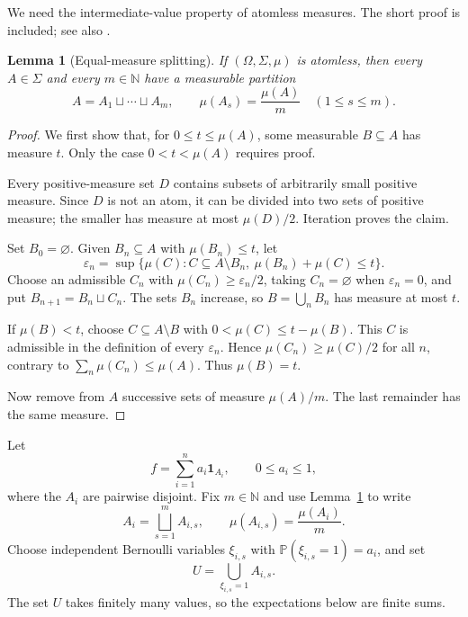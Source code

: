 \documentclass[reqno]{amsart}
\theoremstyle{plain}
\newtheorem{lemma}[theorem]{Lemma}
\theoremstyle{remark}
\newcommand{\one}{\mathbf 1}
\newcommand{\N}{\mathbb N}
\begin{document}
We need the intermediate-value property of atomless measures. The short proof
is included; see also \cite[\S215]{Fremlin}.

\begin{lemma}[Equal-measure splitting]\label{lem:splitting}
If $(\Omega,\Sigma,\mu)$ is atomless, then every $A\in\Sigma$ and every
$m\in\N$ have a measurable partition
\[
  A=A_1\sqcup\cdots\sqcup A_m,
  \qquad
  \mu(A_s)=\frac{\mu(A)}m\quad(1\leq s\leq m).
\]
\end{lemma}

\begin{proof}
We first show that, for $0\leq t\leq\mu(A)$, some measurable $B\subseteq A$
has measure $t$. Only the case $0<t<\mu(A)$ requires proof.

Every positive-measure set $D$ contains subsets of arbitrarily small positive
measure. Since $D$ is not an atom, it can be divided into two sets of positive
measure; the smaller has measure at most $\mu(D)/2$. Iteration proves the
claim.

Set $B_0=\varnothing$. Given $B_n\subseteq A$ with $\mu(B_n)\leq t$, let
\[
  \varepsilon_n=
  \sup\{\mu(C):C\subseteq A\setminus B_n,\ 
                    \mu(B_n)+\mu(C)\leq t\}.
\]
Choose an admissible $C_n$ with $\mu(C_n)\geq\varepsilon_n/2$, taking
$C_n=\varnothing$ when $\varepsilon_n=0$, and put
$B_{n+1}=B_n\sqcup C_n$. The sets $B_n$ increase, so
$B=\bigcup_nB_n$ has measure at most $t$.

If $\mu(B)<t$, choose
$C\subseteq A\setminus B$ with $0<\mu(C)\leq t-\mu(B)$. This $C$ is
admissible in the definition of every $\varepsilon_n$. Hence
$\mu(C_n)\geq\mu(C)/2$ for all $n$, contrary to
$\sum_n\mu(C_n)\leq\mu(A)$. Thus $\mu(B)=t$.

Now remove from $A$ successive sets of measure $\mu(A)/m$. The last remainder
has the same measure.
\end{proof}

Let
\begin{equation}\label{eq:simple-f}
  f=\sum_{i=1}^n a_i\one_{A_i},
  \qquad 0\leq a_i\leq1,
\end{equation}
where the $A_i$ are pairwise disjoint. Fix $m\in\N$ and use
Lemma~\ref{lem:splitting} to write
\begin{equation}\label{eq:block-split}
  A_i=\bigsqcup_{s=1}^mA_{i,s},
  \qquad
  \mu(A_{i,s})=\frac{\mu(A_i)}m.
\end{equation}
Choose independent Bernoulli variables $\xi_{i,s}$ with
$\mathbb P(\xi_{i,s}=1)=a_i$, and set
\begin{equation}\label{eq:random-U}
  U=\bigcup_{\xi_{i,s}=1}A_{i,s}.
\end{equation}
The set $U$ takes finitely many values, so the expectations below are finite
sums.
\end{document}
